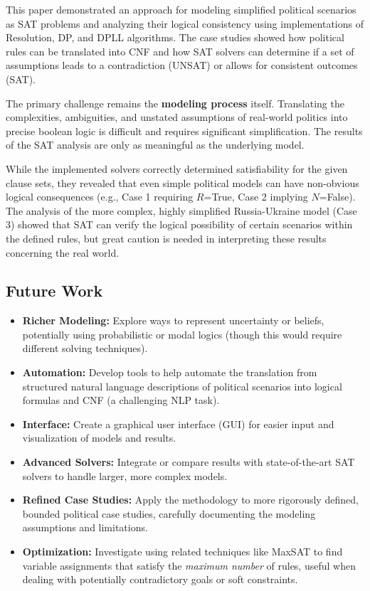 \documentclass[11pt, a4paper]{article}
\begin{document}
This paper demonstrated an approach for modeling simplified political scenarios as SAT problems and analyzing their logical consistency using implementations of Resolution, DP, and DPLL algorithms. The case studies showed how political rules can be translated into CNF and how SAT solvers can determine if a set of assumptions leads to a contradiction (UNSAT) or allows for consistent outcomes (SAT).

The primary challenge remains the \textbf{modeling process} itself. Translating the complexities, ambiguities, and unstated assumptions of real-world politics into precise boolean logic is difficult and requires significant simplification. The results of the SAT analysis are only as meaningful as the underlying model.

While the implemented solvers correctly determined satisfiability for the given clause sets, they revealed that even simple political models can have non-obvious logical consequences (e.g., Case 1 requiring $R$=True, Case 2 implying $N$=False). The analysis of the more complex, highly simplified Russia-Ukraine model (Case 3) showed that SAT can verify the logical possibility of certain scenarios within the defined rules, but great caution is needed in interpreting these results concerning the real world.

\subsection*{Future Work}
\begin{itemize}
    \item \textbf{Richer Modeling:} Explore ways to represent uncertainty or beliefs, potentially using probabilistic or modal logics (though this would require different solving techniques).
    \item \textbf{Automation:} Develop tools to help automate the translation from structured natural language descriptions of political scenarios into logical formulas and CNF (a challenging NLP task).
    \item \textbf{Interface:} Create a graphical user interface (GUI) for easier input and visualization of models and results.
    \item \textbf{Advanced Solvers:} Integrate or compare results with state-of-the-art SAT solvers to handle larger, more complex models.
    \item \textbf{Refined Case Studies:} Apply the methodology to more rigorously defined, bounded political case studies, carefully documenting the modeling assumptions and limitations.
    \item \textbf{Optimization:} Investigate using related techniques like MaxSAT to find variable assignments that satisfy the \textit{maximum number} of rules, useful when dealing with potentially contradictory goals or soft constraints.
\end{itemize}
\end{document}
